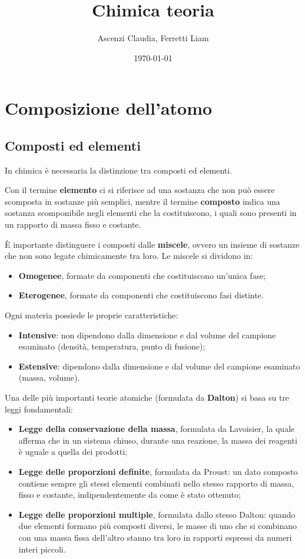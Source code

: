 \documentclass[11pt, a4paper, openright]{book}
\title{Chimica teoria}
\author{Ascenzi Claudia, Ferretti Liam}
\date{\today}
\begin{document}
\maketitle

\tableofcontents
\newpage

\chapter{Composizione dell'atomo}
\section{Composti ed elementi}
In chimica è necessaria la distinzione tra composti ed elementi.

Con il termine \textbf{elemento} ci si riferisce ad una sostanza che non può essere scomposta in sostanze più semplici, mentre il termine \textbf{composto} indica una sostanza scomponibile negli elementi che la costituiscono, i quali sono presenti in un rapporto di massa fisso e costante.

È importante distinguere i composti dalle \textbf{miscele}, ovvero un insieme di sostanze che non sono legate chimicamente tra loro. Le miscele si dividono in:
\begin{itemize}
    \item \textbf{Omogenee}, formate da componenti che costituiscono un'unica fase;
    \item \textbf{Eterogenee}, formate da componenti che costituiscono fasi distinte.
\end{itemize}
Ogni materia possiede le proprie caratteristiche:
\begin{itemize}
    \item \textbf{Intensive}: non dipendono dalla dimensione e dal volume del campione esaminato (densità, temperatura, punto di fusione);
    \item \textbf{Estensive}: dipendono dalla dimensione e dal volume del campione esaminato (massa, volume).
\end{itemize}
Una delle più importanti teorie atomiche (formulata da \textbf{Dalton}) si basa su tre leggi fondamentali:
\begin{itemize}
    \item \textbf{Legge della conservazione della massa}, formulata da Lavoisier, la quale afferma che in un sistema chiuso, durante una reazione, la massa dei reagenti è uguale a quella dei prodotti;
    \item \textbf{Legge delle proporzioni definite}, formulata da Proust: un dato composto contiene sempre gli stessi elementi combinati nello stesso rapporto di massa, fisso e costante, indipendentemente da come è stato ottenuto;
    \item \textbf{Legge delle proporzioni multiple}, formulata dallo stesso Dalton: quando due elementi formano più composti diversi, le masse di uno che si combinano con una massa fissa dell'altro stanno tra loro in rapporti espressi da numeri interi piccoli.
\end{itemize}
\end{document}

